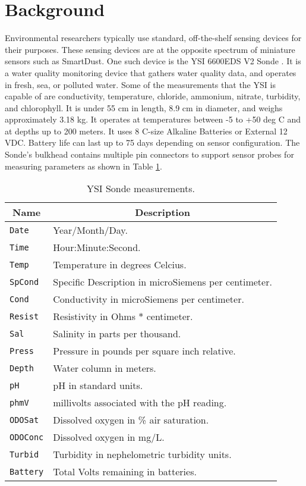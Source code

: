 \documentclass[conference]{IEEEtran}
\begin{document}
\section{Background}
\label{SEC_BACKGROUND}

Environmental researchers typically use standard, off-the-shelf
sensing devices for their purposes. These sensing devices are at the
opposite spectrum of miniature sensors such as SmartDust. One such
device is the YSI 6600EDS V2 Sonde \cite{Sonde01}. It is a water
quality monitoring device that gathers water quality data, and
operates in fresh, sea, or polluted water. Some of the measurements
that the YSI is capable of are conductivity, temperature, chloride,
ammonium, nitrate, turbidity, and chlorophyll.  It is under 55 cm in
length, 8.9 cm in diameter, and weighs approximately 3.18 kg. It
operates at temperatures between -5 to +50 deg C and at depths up to
200 meters.  It uses 8 C-size Alkaline Batteries or External 12 VDC.
Battery life can last up to 75 days depending on sensor configuration.
The Sonde's bulkhead contains multiple pin connectors to support
sensor probes for measuring parameters as shown in Table
\ref{TAB_SONDE_MEASUREMENTS}.

\begin{table}[h]
\caption{\label{TAB_SONDE_MEASUREMENTS} YSI Sonde measurements.}
\centering
\begin{tabular}{|l||l|}
\hline
\multicolumn{1}{|c||}{\textbf{Name}} &
\multicolumn{1}{c|}{\textbf{Description}} \\ \hline \hline
\texttt{Date}    & Year/Month/Day. \\ \hline
\texttt{Time}    & Hour:Minute:Second. \\ \hline
\texttt{Temp}    & Temperature in degrees Celcius. \\ \hline
\texttt{SpCond}  & Specific Description in microSiemens
                   per centimeter. \\ \hline
\texttt{Cond}    & Conductivity in microSiemens per centimeter. \\ \hline
\texttt{Resist}  & Resistivity in Ohms $*$ centimeter. \\ \hline
\texttt{Sal}     & Salinity in parts per thousand. \\ \hline
\texttt{Press}   & Pressure in pounds per square inch relative. \\ \hline
\texttt{Depth}   & Water column in meters. \\ \hline
\texttt{pH}      & pH in standard units. \\ \hline
\texttt{phmV}    & millivolts associated with the pH reading. \\ \hline
\texttt{ODOSat}  & Dissolved oxygen in \% air saturation. \\ \hline
\texttt{ODOConc} & Dissolved oxygen in mg/L. \\ \hline
\texttt{Turbid}  & Turbidity in nephelometric turbidity units. \\ \hline
\texttt{Battery} & Total Volts remaining in batteries.  \\ \hline
\end{tabular}
\end{table}
\end{document}
